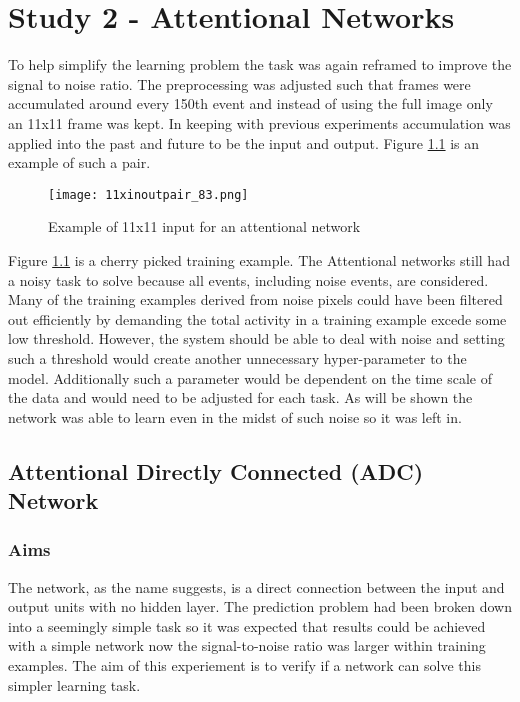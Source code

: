 \chapter{Study 2 - Attentional Networks}
\label{ch:attentional}
To help simplify the learning problem the task was again reframed to improve the signal to noise ratio.
The preprocessing was adjusted such that frames were accumulated around every 150th event and instead of using the full image only an 11x11 frame was kept.
In keeping with previous experiments accumulation was applied into the past and future to be the input and output. 
Figure \ref{fig:11inoutpair} is an example of such a pair.

\begin{figure}[h]
    \centering
    \texttt{[image: 11xinoutpair\_83.png]}
    \caption{Example of 11x11 input for an attentional network}
    \label{fig:11inoutpair}
\end{figure}

Figure \ref{fig:11inoutpair} is a cherry picked training example.
The Attentional networks still had a noisy task to solve because all events, including noise events, are considered. 
Many of the training examples derived from noise pixels could have been filtered out efficiently by demanding the total activity in a training example excede some low threshold.
However, the system should be able to deal with noise and setting such a threshold would create another unnecessary hyper-parameter to the model.
Additionally such a parameter would be dependent on the time scale of the data and would need to be adjusted for each task. 
As will be shown the network was able to learn even in the midst of such noise so it was left in. 

\section{Attentional Directly Connected (ADC) Network}

\subsection{Aims}
The network, as the name suggests, is a direct connection between the input and output units with no hidden layer.
The prediction problem had been broken down into a seemingly simple task so it was expected that results could be achieved with a simple network now the signal-to-noise ratio was larger within training examples.
The aim of this experiement is to verify if a network can solve this simpler learning task.

